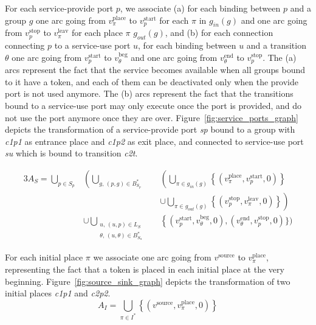 

For each service-provide port $p$, we associate (a) for each binding between
$p$ and a group $g$ one arc going from $v_\pi^\text{place}$ to $v_p^\text{start}$
for each $\pi$ in $g_{in}(g)$ and one arc going from $v_p^\text{stop}$ to
$v_\pi^\text{leav}$ for each place $\pi$ $g_{out}(g)$, and (b) for each
connection connecting $p$ to a service-use port $u$, for each binding between
$u$ and a transition $\theta$ one arc going from $v_p^\text{start}$ to
$v_\theta^\text{beg}$ and one arc going from $v_\theta^\text{end}$ to
$v_p^\text{stop}$.
The (a) arcs represent the fact that the service becomes available when all
groups bound to it have a token, and each of them can be deactivated only when
the provide port is not used anymore. The (b) arcs represent the
fact that the transitions bound to a service-use port may only execute once
the port is provided, and do not use the port anymore once they are over.
Figure~\ref{fig:service_ports_graph} depicts the transformation of a
service-provide port \emph{sp} bound to a group with \emph{c1p1} as entrance
place and \emph{c1p2} as exit place, and connected to service-use port
\emph{su} which is bound to transition \emph{c2t}.

\begin{alignat*}{3}
A_{S}=\bigcup_{p\in S_p}
& \left(\bigcup_{g,\,\left(p,g\right)\in B_{S_{p}}^*} \right. && \left. \left(\bigcup_{\pi\in g_{in}(g)} \left\{\left(v_\pi^\text{place},v_p^\text{start},0\right)\right\}\right.\right. \\
&&& \left. \cup\left.\bigcup_{\pi\in g_{out}(g)} \left\{\left(v_p^\text{stop},v_\pi^\text{leav},0\right)\right\}\right)\right. \\
& \left.\cup\bigcup_{\substack{u,\,\left(u,p\right)\in L_S \\
      \theta,\,\left(u,\theta\right)\in B_{S_{u}}^*}} \right. && \left. \left\{ \left(v_p^\text{start},v_\theta^\text{beg},0\right),\right.\right. \left.\left.\left(v_\theta^\text{end},v_p^\text{stop},0\right)\right.\Big\}\right.\Bigg)
\end{alignat*}



For each initial place $\pi$ we associate one arc going from $v^\text{source}$
 to $v_\pi^\text{place}$, representing the fact that a token is placed in each
 initial place at the very beginning.
Figure~\ref{fig:source_sink_graph} depicts the transformation of two initial
places \emph{c1p1} and \emph{c2p2}.
\[
A_{I}=\bigcup_{\pi\in I^*}\left\{ \left(v^\text{source},v_\pi^\text{place},0\right)\right\} 
\]

